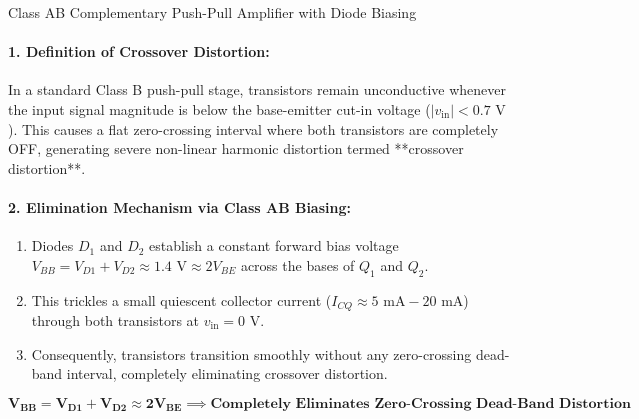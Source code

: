 \documentclass[11pt,a4paper,oneside]{book}
\begin{document}
\begin{schematicbox}{Class AB Complementary Push-Pull Amplifier with Diode Biasing}
\end{schematicbox}

\paragraph{1. Definition of Crossover Distortion:}
In a standard Class B push-pull stage, transistors remain unconductive whenever the input signal magnitude is below the base-emitter cut-in voltage ($|v_{\text{in}}| < 0.7\text{ V}$). This causes a flat zero-crossing interval where both transistors are completely OFF, generating severe non-linear harmonic distortion termed **crossover distortion**.

\paragraph{2. Elimination Mechanism via Class AB Biasing:}
\begin{enumerate}[leftmargin=1.5em]
  \item Diodes $D_1$ and $D_2$ establish a constant forward bias voltage $V_{BB} = V_{D1} + V_{D2} \approx 1.4\text{ V} \approx 2V_{BE}$ across the bases of $Q_1$ and $Q_2$.
  \item This trickles a small quiescent collector current ($I_{CQ} \approx 5\text{ mA} - 20\text{ mA}$) through both transistors at $v_{\text{in}} = 0\text{ V}$.
  \item Consequently, transistors transition smoothly without any zero-crossing dead-band interval, completely eliminating crossover distortion.
\end{enumerate}

\begin{answerbox}
$$\mathbf{V_{BB} = V_{D1} + V_{D2} \approx 2V_{BE} \implies \text{Completely Eliminates Zero-Crossing Dead-Band Distortion}}$$
\end{answerbox}
\end{document}
